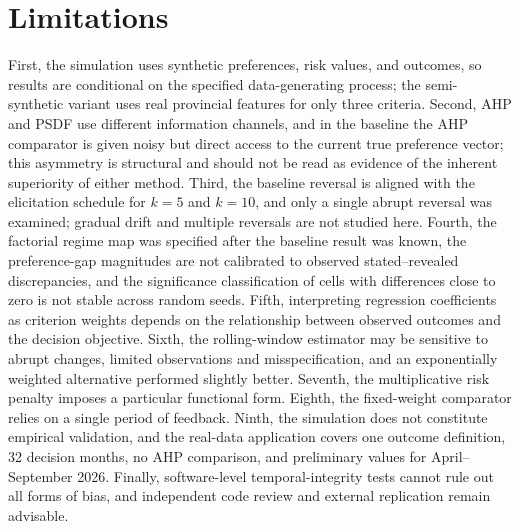 \documentclass[12pt,a4paper]{article}
\begin{document}
\section{Limitations}
First, the simulation uses synthetic preferences, risk values, and outcomes, so results are conditional on the specified data-generating process; the semi-synthetic variant uses real provincial features for only three criteria. Second, AHP and PSDF use different information channels, and in the baseline the AHP comparator is given noisy but direct access to the current true preference vector; this asymmetry is structural and should not be read as evidence of the inherent superiority of either method. Third, the baseline reversal is aligned with the elicitation schedule for $k=5$ and $k=10$, and only a single abrupt reversal was examined; gradual drift and multiple reversals are not studied here. Fourth, the factorial regime map was specified after the baseline result was known, the preference-gap magnitudes are not calibrated to observed stated--revealed discrepancies, and the significance classification of cells with differences close to zero is not stable across random seeds. Fifth, interpreting regression coefficients as criterion weights depends on the relationship between observed outcomes and the decision objective. Sixth, the rolling-window estimator may be sensitive to abrupt changes, limited observations and misspecification, and an exponentially weighted alternative performed slightly better. Seventh, the multiplicative risk penalty imposes a particular functional form. Eighth, the fixed-weight comparator relies on a single period of feedback. Ninth, the simulation does not constitute empirical validation, and the real-data application covers one outcome definition, 32 decision months, no AHP comparison, and preliminary values for April--September 2026. Finally, software-level temporal-integrity tests cannot rule out all forms of bias, and independent code review and external replication remain advisable.
\end{document}
